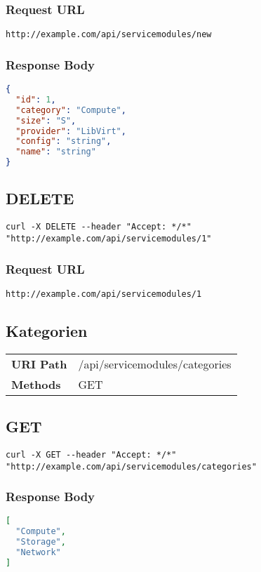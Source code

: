 \subsubsection{Request URL}
\begin{lstlisting}[] 
http://example.com/api/servicemodules/new
\end{lstlisting}

\subsubsection{Response Body}
\begin{lstlisting}[language=json] 
{
  "id": 1,
  "category": "Compute",
  "size": "S",
  "provider": "LibVirt",
  "config": "string",
  "name": "string"
}
\end{lstlisting}

\subsection{DELETE}
\begin{lstlisting}[] 
curl -X DELETE --header "Accept: */*" "http://example.com/api/servicemodules/1"
\end{lstlisting}

\subsubsection{Request URL}
\begin{lstlisting}[] 
http://example.com/api/servicemodules/1
\end{lstlisting}


\subsection{Kategorien}
\begin{tabularx}{\linewidth}{l l}
\textbf{URI Path} & /api/servicemodules/categories\\
\textbf{Methods} & GET\\
\end{tabularx}
\subsection{GET}
\begin{lstlisting}[] 
curl -X GET --header "Accept: */*" "http://example.com/api/servicemodules/categories"
\end{lstlisting}

\subsubsection{Response Body}
\begin{lstlisting}[language=json] 
[
  "Compute",
  "Storage",
  "Network"
]
\end{lstlisting}

